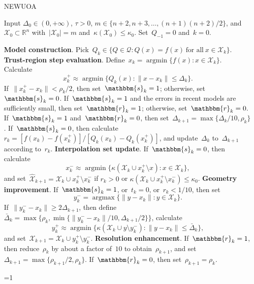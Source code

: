 \documentclass[11pt,a4paper,draft]{article}  %
\newcommand{\bibfile}{\jobname.bib}  %
\newcommand{\iscite}{0}  %
\theoremstyle{definition}
\numberwithin{equation}{section}
\DeclareMathOperator*{\argmax}{argmax}
\DeclareMathOperator*{\argmin}{argmin}
\newcommand{\shortd}{\mathbbm{s}}
\newcommand{\redrho}{\mathbbm{r}}
\newcommand{\RR}{\mathbb{R}}
\newcommand{\Int}{\mathcal{X}}
\newcommand{\Qua}{\mathcal{Q}}
\newcommand{\sss}[1]{{\scriptscriptstyle{#1}}}
\newcommand{\get}{{\sss{+}}}
\newcommand{\drop}{{\sss{-}}}
\begin{document}
\begin{algorithm}[htbp!]
    \caption{\label{alg:newuoa}NEWUOA}
    Input $\Delta_0\in (0,+\infty)$, $\tau>0$, $m\in \{n+2, n+3, \dots, (n+1)(n+2)/2\}$,
    and~$\Int_0\subset \RR^n$ with~$|\Int_0|=m$ and~$\kappa(\Int_0) \le \kappa_0$. Set~$Q_{-1} = 0$ and~$k=0$.
    \begin{algorithmic}[1]
        \State \textbf{Model construction}.
        Pick~$Q_k \in \{Q\in\Qua\mathrel{:} Q(x)=f(x)~\text{for all}~x\in\Int_k\}$.
        \State \textbf{Trust-region step evaluation}.
        Define~$x_k = \argmin\{f(x) \mathrel{:} x\in \Int_k\}$. Calculate
        \begin{equation}
         \label{eq:xgetn}
          x_k^\get \approx \argmin\{Q_k(x)\mathrel{:} \|x-x_k\|\le \Delta_k\}.
        \end{equation}
        If~$\|x_k^\get-x_k\| < \rho_k/2$, then set~$\shortd_k = 1$; otherwise, set~$\shortd_k = 0$.
        If~$\shortd_k = 1$ and the errors in recent models are sufficiently small, then set~$\redrho_k = 1$; otherwise, set~$\redrho_k = 0$.
        If~$\shortd_k=1$ and~$\redrho_k = 0$, then set~$\Delta_{k+1} = \max\{\Delta_k/10, \rho_k\}$.
        If~$\shortd_k = 0$, then calculate~$r_k = [f(x_k)-f(x_k^\get)]/[Q_k(x_k)-Q_k(x_k^\get)]$,
        and update~$\Delta_k$ to~$\Delta_{k+1}$ according to~$r_k$.
        \State \textbf{Interpolation set update}.
        If~$\shortd_k = 0$, then calculate
        \begin{equation}
            \label{eq:xdropn}
            x_k^\drop \approx \argmin\{\kappa(\Int_k\cup x_k^\get\setminus x) \mathrel{:} x \in
            \Int_k\},
        \end{equation}
        and set~$\hat{\Int}_{k+1} = \Int_k\cup x_k^\get\setminus x_k^\drop$
        if $r_k>0$ or $\kappa(\Int_k\cup x_k^\get \setminus x_k^\drop) \le \kappa_0$.
        \State \textbf{Geometry improvement}.
        If~$\shortd_k = 1$, or~$t_k = 0$, or~$r_k < 1/10$, then set
          \begin{equation}
              \label{eq:ydropn}
              y_k^\drop = \argmax\{\|y-x_k\| \mathrel{:} y \in \Int_k\}.
          \end{equation}
          If~$\|y_k^{\drop}-x_k\| \ge 2\Delta_{k+1}$, then define~$\bar{\Delta}_k = \max\{\rho_k,
          \min\{\|y_k^{\drop} - x_k\|/10, \Delta_{k+1}/2\}\}$, calculate
          \begin{equation}
              \label{eq:ygetn}
              y_k^\get \approx \argmin\{\kappa(\Int_k \cup y \setminus y_k^\drop) \mathrel{:} \|y-x_k\|\le
              \bar{\Delta}_k\},
          \end{equation}
       and set~$\Int_{k+1} = \Int_k\cup y_k^\get\setminus y_k^\drop$.
       \State \textbf{Resolution enhancement}.
       If~$\redrho_k = 1$, then reduce~$\rho_k$ by about a factor of~$10$ to
       obtain~$\rho_{k+1}$, and set~$\Delta_{k+1} = \max\{\rho_{k+1}/2, \rho_k\}$.
       If~$\redrho_{k} = 0$, then set~$\rho_{k+1} = \rho_k$.
    \end{algorithmic}
\end{algorithm}


\ifnum\iscite=1
    \small
    
    
\fi

\end{document}
